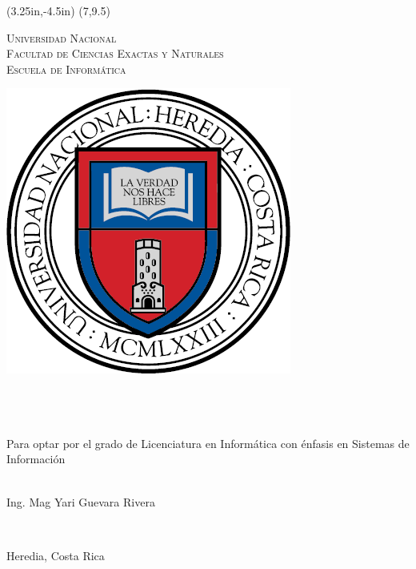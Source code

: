 \begin{titlepage}
\thisfancyput(3.25in,-4.5in){%
  \setlength{\unitlength}{1in}\fancyoval(7,9.5)}%
	\begin{center}	
	\textcolor{unablue}{%
		\textsc{\LARGE Universidad Nacional}
		\\[0.5cm]
		\textsc{\Large Facultad de Ciencias Exactas y Naturales}
		\\[0.5cm]
		\textsc{\Large Escuela de Inform\'{a}tica}		
		\\[0.5cm]
	}
	\begin{center}
		\includegraphics[scale=0.5]{images/escudo.png}
	\end{center}
	
	
	\vfill
	 
		
	\HRule 
	\\[0.9cm]
	\doublespacing
	{
		\large
		\bfseries
		\thesistitle
	}
	\\[0.4cm]
	\singlespacing
	\HRule 
	\\[1.4cm]

	{
		\large Para optar por el grado de Licenciatura en Inform\'{a}tica con
		\'{e}nfasis en Sistemas de Informaci\'{o}n\\[1 cm]
	}
	
	\vfill
	 
	
	\begin{minipage}{0.45\textwidth}
		\begin{flushleft} 
			\large
			\centering
			\textsc{}\\
			{Ing. Mag Yari Guevara Rivera}
		\end{flushleft}
	\end{minipage}
	\\[1.6 cm]
	\vfill
	
	
	{
		\large Heredia, Costa Rica
	}
	\end{center}
\end{titlepage}